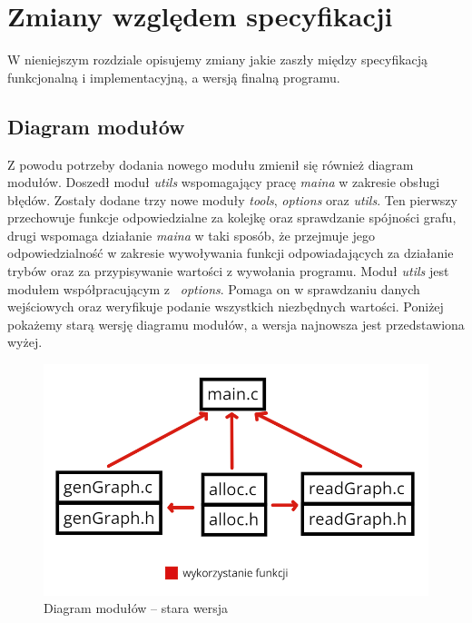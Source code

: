 \documentclass[10pt, a4paper]{report}
\begin{document}
    \newpage
    \section{Zmiany względem specyfikacji}
    W nieniejszym rozdziale opisujemy zmiany jakie zaszły między specyfikacją funkcjonalną i implementacyjną, a wersją finalną programu.

    \subsection{Diagram modułów}
    Z powodu potrzeby dodania nowego modułu zmienił się również diagram modułów.
    Doszedł moduł \textit{utils} wspomagający pracę \textit{maina} w zakresie obsługi błędów. Zostały dodane trzy nowe moduły \textit{tools}, \textit{options} oraz \textit{utils}. Ten pierwszy przechowuje funkcje odpowiedzialne za kolejkę oraz sprawdzanie spójności grafu, drugi
    wspomaga działanie \textit{maina} w taki sposób, że przejmuje jego odpowiedzialność w zakresie wywoływania funkcji odpowiadających za działanie trybów oraz za przypisywanie wartości z wywołania programu. Moduł \textit{utils} jest modułem współpracującym z~ \textit{options}.
    Pomaga on w sprawdzaniu danych wejściowych oraz weryfikuje podanie wszystkich niezbędnych wartości.
    Poniżej pokażemy starą wersję diagramu modułów, a wersja najnowsza jest przedstawiona wyżej.

    \begin{figure}[ht]
        \begin{center}
            \includegraphics[scale=0.35]{module_diagram_old.jpg}
            \caption{Diagram modułów -- stara wersja}
        \end{center}
    \end{figure}
\end{document}
